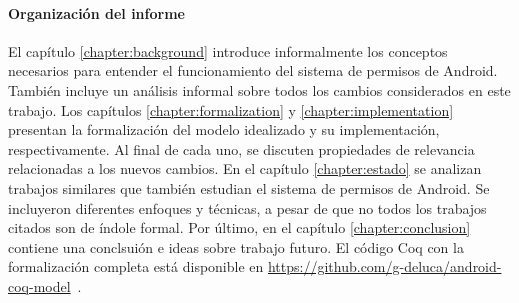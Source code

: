 \paragraph{Organización del informe}
El capítulo \ref{chapter:background} introduce informalmente los conceptos necesarios para entender
el funcionamiento del sistema de permisos de Android. También incluye un análisis informal sobre
todos los cambios considerados en este trabajo. Los capítulos \ref{chapter:formalization} y
\ref{chapter:implementation} presentan la formalización del modelo idealizado y su implementación,
respectivamente. Al final de cada uno, se discuten propiedades de relevancia relacionadas a los
nuevos cambios. En el capítulo \ref{chapter:estado} se analizan trabajos similares que también
estudian el sistema de permisos de Android. Se incluyeron diferentes enfoques y técnicas, a pesar de
que no todos los trabajos citados son de índole formal. Por último, en el capítulo
\ref{chapter:conclusion} contiene una conclsuión e ideas sobre trabajo futuro. El código Coq con la
formalización completa está disponible en
\url{https://github.com/g-deluca/android-coq-model}~\cite{github-code}.